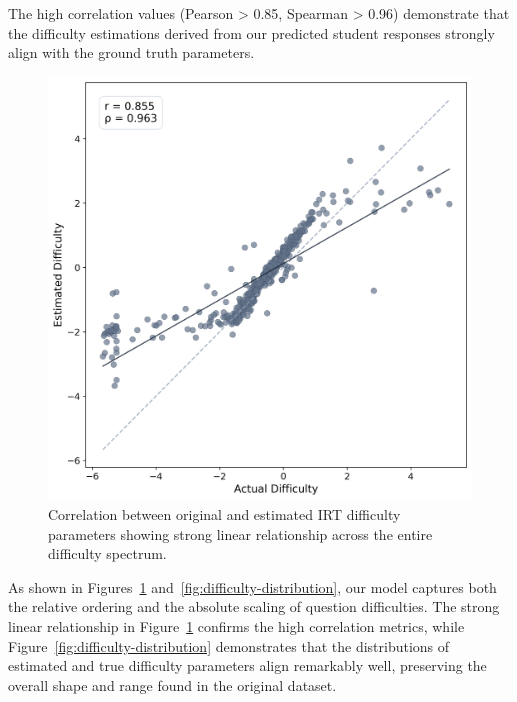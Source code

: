 \documentclass[11pt]{article}
\begin{document}
The high correlation values (Pearson > 0.85, Spearman > 0.96) demonstrate that the difficulty estimations derived from our predicted student responses strongly align with the ground truth parameters.

\begin{figure}[!ht] %
    \centering
    \includegraphics[width=1\columnwidth]{../../one_model_experiment/figures/difficulty_comparison.png}
    \caption{Correlation between original and estimated IRT difficulty parameters showing strong linear relationship across the entire difficulty spectrum.}
    \label{fig:difficulty-correlation}
\end{figure}

As shown in Figures~\ref{fig:difficulty-correlation} and~\ref{fig:difficulty-distribution}, our model captures both the relative ordering and the absolute scaling of question difficulties. The strong linear relationship in Figure~\ref{fig:difficulty-correlation} confirms the high correlation metrics, while Figure~\ref{fig:difficulty-distribution} demonstrates that the distributions of estimated and true difficulty parameters align remarkably well, preserving the overall shape and range found in the original dataset.
\end{document}
